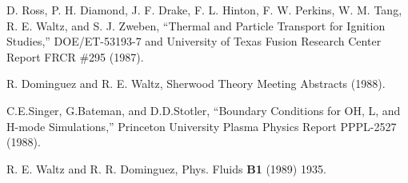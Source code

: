 \begin{thebibliography}{99}
 D. Ross, P. H. Diamond, J. F. Drake,
F. L. Hinton, F. W. Perkins, W. M. Tang, R. E. Waltz,
and S. J. Zweben, ``Thermal and Particle Transport
for Ignition Studies,'' DOE/ET-53193-7 and
University of Texas Fusion Research Center Report
FRCR \#295 (1987).

 R. Dominguez and
R. E. Waltz, Sherwood Theory Meeting Abstracts (1988).

 C.E.Singer, G.Bateman, and D.D.Stotler,
``Boundary Conditions for OH, L, and H-mode Simulations,''
Princeton University Plasma Physics Report PPPL-2527 (1988).

 R. E. Waltz and R. R. Dominguez, Phys. Fluids
{\bf B1} (1989) 1935.

\end{thebibliography}


